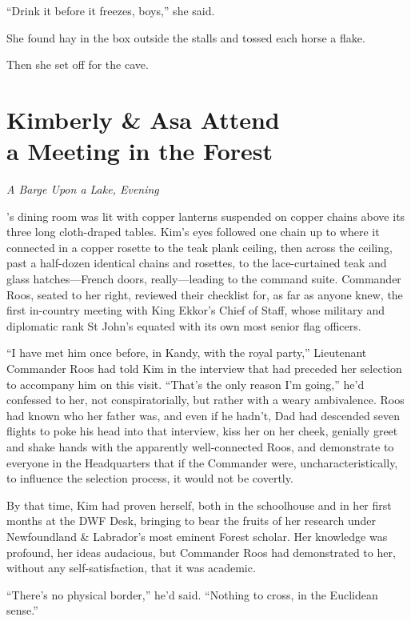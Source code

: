 \documentclass[11pt,a5paper]{article}
\newcommand{\alet}[1]{\textit{#1}\vspace{1em}}
\begin{document}
``Drink it before it freezes, boys,'' she said.

She found hay in the box outside the stalls and tossed each horse a flake.

Then she set off for the cave.

\newpage

\section{Kimberly \& Asa Attend\\a Meeting in the Forest}

\alet{A Barge Upon a Lake, Evening}

's dining room was lit with copper lanterns suspended on copper chains above its three long cloth-draped tables. Kim's eyes followed one chain up to where it connected in a copper rosette to the teak plank ceiling, then across the ceiling, past a half-dozen identical chains and rosettes, to the lace-curtained teak and glass hatches---French doors, really---leading to the command suite. Commander Roos, seated to her right, reviewed their checklist for, as far as anyone knew, the first in-country meeting with King Ekkor's Chief of Staff, whose military and diplomatic rank St John's equated with its own most senior flag officers.

``I have met him once before, in Kandy, with the royal party,'' Lieutenant Commander Roos had told Kim in the interview that had preceded her selection to accompany him on this visit. ``That's the only reason I'm going,'' he'd confessed to her, not conspiratorially, but rather with a weary ambivalence. Roos had known who her father was, and even if he hadn't, Dad had descended seven flights to poke his head into that interview, kiss her on her cheek, genially greet and shake hands with the apparently well-connected Roos, and demonstrate to everyone in the Headquarters that if the Commander were, uncharacteristically, to influence the selection process, it would not be covertly.

By that time, Kim had proven herself, both in the schoolhouse and in her first months at the DWF Desk, bringing to bear the fruits of her research under Newfoundland \& Labrador's most eminent Forest scholar. Her knowledge was profound, her ideas audacious, but Commander Roos had demonstrated to her, without any self-satisfaction, that it was academic.

``There's no physical border,'' he'd said. ``Nothing to cross, in the Euclidean sense.''
\end{document}
